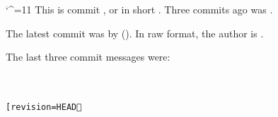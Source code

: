 \catcode`^=11
This is commit \gitcommithash[shortHash=false], or in short \gitcommithash.
Three commits ago was \gitcommithash[revision=HEAD^^^].

The latest commit was by \gitcommitauthorname{} (\gitcommitauthoremail).
In raw format, the author is \texttt{\gitcommitauthor}.

The last three commit messages were:

{\tt\small
	\gitcommitmsg\\
	\gitcommitmsg[revision=HEAD^]\\
	\gitcommitmsg[revision=HEAD^^]}
